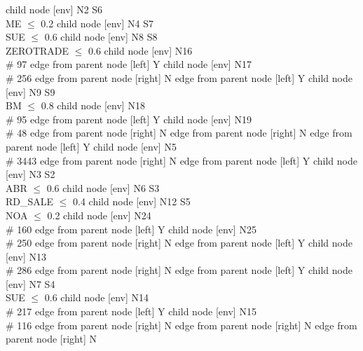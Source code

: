 
      child { node [env] {N2  S6 \\ ME $\leq$ 0.2} 
            child { node [env] {N4  S7 \\ SUE $\leq$ 0.6} 
                  child { node [env] {N8  S8 \\ ZEROTRADE $\leq$ 0.6} 
                        child { node [env] {N16   \\ \# 97 } 
                              edge from parent node [left] {Y} 
                        }
                        child { node [env] {N17   \\ \# 256 } 
                              edge from parent node [right] {N} 
                        }
                        edge from parent node [left] {Y} 
                  }
                  child { node [env] {N9  S9 \\ BM $\leq$ 0.8} 
                        child { node [env] {N18   \\ \# 95 } 
                              edge from parent node [left] {Y} 
                        }
                        child { node [env] {N19   \\ \# 48 } 
                              edge from parent node [right] {N} 
                        }
                        edge from parent node [right] {N} 
                  }
                  edge from parent node [left] {Y} 
            }
            child { node [env] {N5   \\ \# 3443 } 
                  edge from parent node [right] {N} 
            }
            edge from parent node [left] {Y} 
      }
      child { node [env] {N3  S2 \\ ABR $\leq$ 0.6} 
            child { node [env] {N6  S3 \\ RD\_SALE $\leq$ 0.4} 
                  child { node [env] {N12  S5 \\ NOA $\leq$ 0.2} 
                        child { node [env] {N24   \\ \# 160 } 
                              edge from parent node [left] {Y} 
                        }
                        child { node [env] {N25   \\ \# 250 } 
                              edge from parent node [right] {N} 
                        }
                        edge from parent node [left] {Y} 
                  }
                  child { node [env] {N13   \\ \# 286 } 
                        edge from parent node [right] {N} 
                  }
                  edge from parent node [left] {Y} 
            }
            child { node [env] {N7  S4 \\ SUE $\leq$ 0.6} 
                  child { node [env] {N14   \\ \# 217 } 
                        edge from parent node [left] {Y} 
                  }
                  child { node [env] {N15   \\ \# 116 } 
                        edge from parent node [right] {N} 
                  }
                  edge from parent node [right] {N} 
            }
            edge from parent node [right] {N} 
      }

